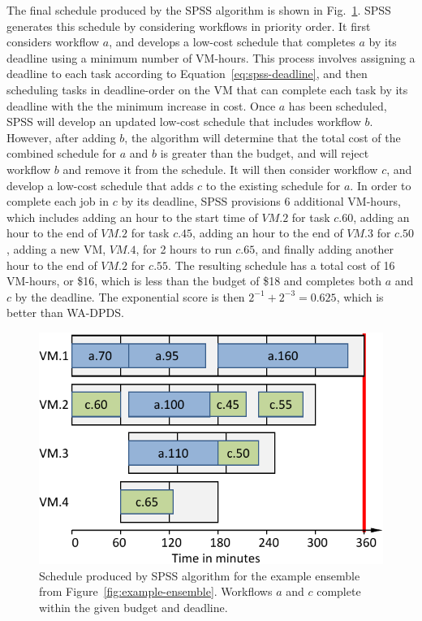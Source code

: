 \documentclass[preprint,5p]{elsarticle}
\begin{document}
The final schedule produced by the SPSS algorithm is shown in
Fig.~\ref{fig:algorithms-example-spss}. SPSS generates this schedule by
considering workflows in priority order. It first considers workflow $a$, and
develops a low-cost schedule that completes $a$ by its deadline using a minimum
number of VM-hours. This process involves assigning a deadline to each task
according to Equation~\ref{eq:spss-deadline}, and then scheduling tasks in
deadline-order on the VM that can complete each task by its deadline with the
the minimum increase in cost. Once $a$ has been scheduled, SPSS will develop an
updated low-cost schedule that includes workflow $b$. However, after adding $b$,
the algorithm will determine that the total cost of the combined schedule
for $a$ and $b$ is greater than the budget, and will reject workflow $b$ and
remove it from the schedule. It will then consider workflow $c$, and develop
a low-cost schedule that adds $c$ to the existing schedule for $a$. In order
to complete each job in $c$ by its deadline, SPSS provisions 6 additional
VM-hours, which includes adding an hour to the start time of $VM.2$ for task
$c.60$, adding an hour to the end of $VM.2$ for task $c.45$, adding an hour
to the end of $VM.3$ for $c.50$, adding a new VM, $VM.4$, for 2 hours to run
$c.65$, and finally adding another hour to the end of $VM.2$ for $c.55$. The
resulting schedule has a total cost of 16 VM-hours, or \$16, which is less
than the budget of \$18 and completes both $a$ and $c$ by the deadline.
The exponential score is then $2^{-1}+2^{-3} = 0.625$, which is better than WA-DPDS.

\begin{figure}[htb] 
  \centering
  \includegraphics[width=0.80\columnwidth]{figures/algorithms-example-spss}
  \caption{Schedule produced by SPSS algorithm for the example ensemble from Figure~\ref{fig:example-ensemble}.
  Workflows $a$ and $c$ complete within the given budget and deadline.}
  \label{fig:algorithms-example-spss}
\end{figure}
\end{document}
